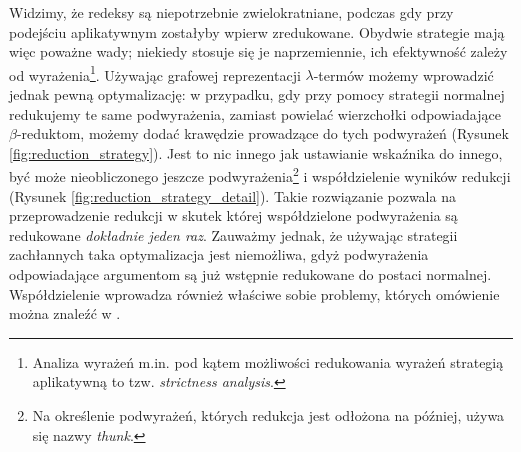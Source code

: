 Widzimy, że redeksy są niepotrzebnie zwielokratniane, podczas gdy przy podejściu aplikatywnym zostałyby wpierw zredukowane. Obydwie strategie mają więc poważne wady; niekiedy stosuje się je naprzemiennie, ich efektywność zależy od wyrażenia\footnote{Analiza wyrażeń m.in. pod kątem możliwości redukowania wyrażeń strategią aplikatywną to tzw. \emph{strictness analysis}.}. Używając grafowej reprezentacji \(\lambda\)-termów możemy wprowadzić jednak pewną optymalizację: w przypadku, gdy przy pomocy strategii normalnej redukujemy te same podwyrażenia, zamiast powielać wierzchołki odpowiadające \(\beta\)-reduktom, możemy dodać krawędzie prowadzące do tych podwyrażeń (Rysunek \ref{fig:reduction_strategy}). Jest to nic innego jak ustawianie wskaźnika do innego, być może nieobliczonego jeszcze podwyrażenia\footnote{Na określenie podwyrażeń, których redukcja jest odłożona na później, używa się nazwy \emph{thunk}.} i współdzielenie wyników redukcji (Rysunek \ref{fig:reduction_strategy_detail}). Takie rozwiązanie pozwala na przeprowadzenie redukcji w skutek której współdzielone podwyrażenia są redukowane \emph{dokładnie jeden raz}. Zauważmy jednak, że używając strategii zachłannych taka optymalizacja jest niemożliwa, gdyż podwyrażenia odpowiadające argumentom są już wstępnie redukowane do postaci normalnej. Współdzielenie wprowadza również właściwe sobie problemy, których omówienie można znaleźć w \cite[Rozdział 3.8.3]{parallel_graph_rewriting}.

